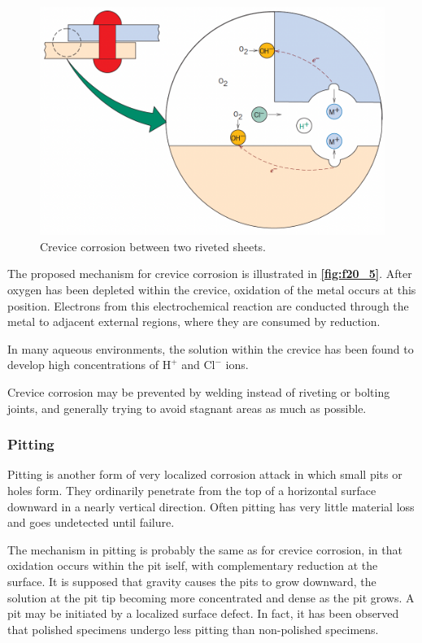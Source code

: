 \begin{figure} [ht]
  \centering
  \includegraphics[width=0.5\linewidth]{./figures/f20_5.png}
  \caption{Crevice corrosion between two riveted sheets.}
  \label{fig:f20_5}
\end{figure}

The proposed mechanism for crevice corrosion is illustrated in \textbf{\autoref{fig:f20_5}}. After oxygen has been depleted within the crevice, oxidation of the metal occurs at this position. Electrons from this electrochemical reaction are conducted through the metal to adjacent external regions, where they are consumed by reduction. 

In many aqueous environments, the solution within the crevice has been found to develop high concentrations of $\mathrm{H}^{+}$ and $\mathrm{Cl}^{-}$ ions.

Crevice corrosion may be prevented by welding instead of riveting or bolting joints, and generally trying to avoid stagnant areas as much as possible.

\subsubsection{Pitting}
Pitting is another form of very localized corrosion attack in which small pits or holes form. They ordinarily penetrate from the top of a horizontal surface downward in a nearly vertical direction. Often pitting has very little material loss and goes undetected until failure.

The mechanism in pitting is probably the same as for crevice corrosion, in that oxidation occurs within the pit iself, with complementary reduction at the surface. It is supposed that gravity causes the pits to grow downward, the solution at the pit tip becoming more concentrated and dense as the pit grows. A pit may be initiated by a localized surface defect. In fact, it has been observed that polished specimens undergo less pitting than non-polished specimens.


